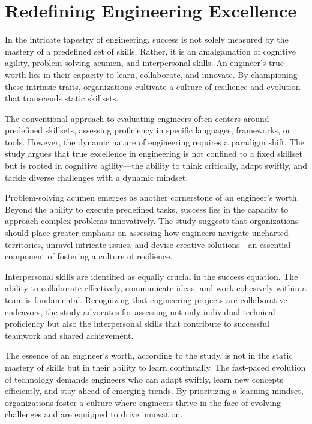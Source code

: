 \documentclass[
    a4paper, %
    10pt, %
    unnumberedsections, %
    twoside, %
]{LTJournalArticle}
\begin{document}

\section{Redefining Engineering Excellence}

In the intricate tapestry of engineering, success is not solely measured by the mastery of a predefined set of skills. Rather, it is an amalgamation of cognitive agility, problem-solving acumen, and interpersonal skills. An engineer's true worth lies in their capacity to learn, collaborate, and innovate. By championing these intrinsic traits, organizations cultivate a culture of resilience and evolution that transcends static skillsets.

The conventional approach to evaluating engineers often centers around predefined skillsets, assessing proficiency in specific languages, frameworks, or tools. However, the dynamic nature of engineering requires a paradigm shift. The study argues that true excellence in engineering is not confined to a fixed skillset but is rooted in cognitive agility—the ability to think critically, adapt swiftly, and tackle diverse challenges with a dynamic mindset.

Problem-solving acumen emerges as another cornerstone of an engineer's worth. Beyond the ability to execute predefined tasks, success lies in the capacity to approach complex problems innovatively. The study suggests that organizations should place greater emphasis on assessing how engineers navigate uncharted territories, unravel intricate issues, and devise creative solutions—an essential component of fostering a culture of resilience.

Interpersonal skills are identified as equally crucial in the success equation. The ability to collaborate effectively, communicate ideas, and work cohesively within a team is fundamental. Recognizing that engineering projects are collaborative endeavors, the study advocates for assessing not only individual technical proficiency but also the interpersonal skills that contribute to successful teamwork and shared achievement.

The essence of an engineer's worth, according to the study, is not in the static mastery of skills but in their ability to learn continually. The fast-paced evolution of technology demands engineers who can adapt swiftly, learn new concepts efficiently, and stay ahead of emerging trends. By prioritizing a learning mindset, organizations foster a culture where engineers thrive in the face of evolving challenges and are equipped to drive innovation.
\end{document}
